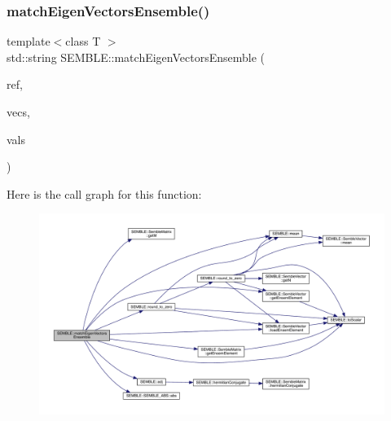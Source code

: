 \subsubsection{\texorpdfstring{matchEigenVectorsEnsemble()}{matchEigenVectorsEnsemble()}\hspace{0.1cm}{\footnotesize\ttfamily [2/2]}}
{\footnotesize\ttfamily template$<$class T $>$ \\
std\+::string S\+E\+M\+B\+L\+E\+::match\+Eigen\+Vectors\+Ensemble (\begin{DoxyParamCaption}\item[{const \mbox{\hyperlink{structSEMBLE_1_1SembleMatrix}{Semble\+Matrix}}$<$ T $>$ \&}]{ref,  }\item[{\mbox{\hyperlink{structSEMBLE_1_1SembleMatrix}{Semble\+Matrix}}$<$ T $>$ \&}]{vecs,  }\item[{\mbox{\hyperlink{structSEMBLE_1_1SembleVector}{Semble\+Vector}}$<$ double $>$ \&}]{vals }\end{DoxyParamCaption})}

Here is the call graph for this function\+:
\nopagebreak
\begin{figure}[H]
\begin{center}
\leavevmode
\includegraphics[width=350pt]{d7/dfd/namespaceSEMBLE_ad6ce16294510dbd0badf0aa5cdbacbd6_cgraph}
\end{center}
\end{figure}
\mbox{\label{namespaceSEMBLE_ac0296558b0b7cbba72850a107357a4ab}} 
